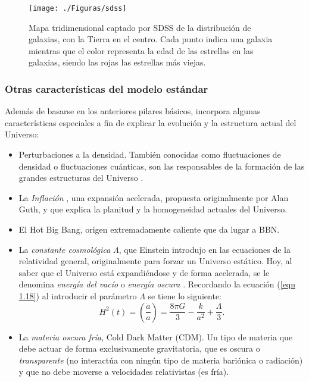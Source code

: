 \documentclass[a4paper,openright,12pt]{book}
\begin{document}
\begin{figure}
\centering
  \texttt{[image: ./Figuras/sdss]}
  \caption{\footnotesize{Mapa tridimensional captado por SDSS de la distribución de galaxias, con la Tierra en el centro. Cada punto indica una galaxia mientras que el color representa la edad de las estrellas en las galaxias, siendo las rojas las estrellas más viejas.}}
  \label{fig 1.5}
\end{figure}

\subsubsection*{Otras características del modelo estándar}
Además de basarse en los anteriores pilares básicos, incorpora algunas características especiales a fin de explicar la evolución y la estructura actual del Universo:
\begin{itemize}
\item Perturbaciones a la densidad. También conocidas como fluctuaciones de densidad o fluctuaciones cuánticas, son las responsables de la formación de las grandes estructuras del Universo \cite{1.2.3}.

\item La \textit{Inflación} \cite{1.2.1}, una expansión acelerada, propuesta originalmente por Alan Guth, y que explica la planitud y la homogeneidad actuales del Universo.

\item El Hot Big Bang, origen extremadamente caliente que da lugar a BBN.

\item La \textit{constante cosmológica} $\Lambda$, que Einstein introdujo en las ecuaciones de la relatividad general, originalmente para forzar un Universo estático. Hoy, al saber que el Universo está expandiéndose y de forma acelerada, se le denomina \textit{energía del vacío} o \textit{energía oscura} \cite{1.2.2}. Recordando la ecuación (\ref{eqn 1.18}) al introducir el parámetro $\Lambda$ se tiene lo siguiente:
\begin{equation}
H^{2}(t) = \left(\frac{\dot{a}}{a}\right)
= 
\frac{8 \pi G}{3} - \frac{k}{a^{2}} + \frac{\Lambda}{3}.\label{eqn 1.43}
\end{equation}
\item La \textit{materia oscura fría}, Cold Dark Matter (CDM). Un tipo de materia que debe actuar de forma exclusivamente gravitatoria, que es oscura o \textit{transparente} (no interactúa con ningún tipo de materia bariónica o radiación) y que no debe moverse a velocidades relativistas (es fría).


\end{itemize}
\end{document}
